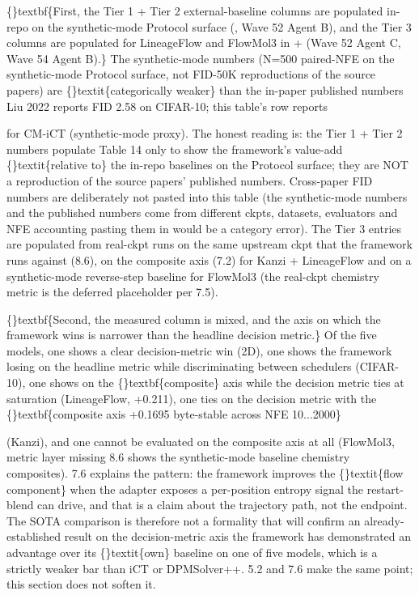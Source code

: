 \documentclass{article}
\begin{document}
\{\}textbf\{First, the Tier 1 + Tier 2 external-baseline columns are populated in-repo on the synthetic-mode Protocol surface (, Wave 52 Agent B), and the Tier 3 columns are populated for LineageFlow and FlowMol3 in  +  (Wave 52 Agent C, Wave 54 Agent B).\} The synthetic-mode numbers (N=500 paired-NFE on the synthetic-mode Protocol surface, not FID-50K reproductions of the source papers) are \{\}textit\{categorically weaker\} than the in-paper published numbers  Liu 2022 reports FID 2.58 on CIFAR-10; this table's  row reports

 for CM-iCT (synthetic-mode proxy). The honest reading is: the Tier 1 + Tier 2 numbers populate Table 14 only to show the framework's value-add \{\}textit\{relative to\} the in-repo baselines on the Protocol surface; they are NOT a reproduction of the source papers' published numbers. Cross-paper FID numbers are deliberately not pasted into this table (the synthetic-mode numbers and the published numbers come from different ckpts, datasets, evaluators and NFE accounting  pasting them in would be a category error). The Tier 3 entries are populated from real-ckpt runs on the same upstream ckpt that the framework runs against (8.6), on the composite axis (7.2) for Kanzi + LineageFlow and on a synthetic-mode reverse-step baseline for FlowMol3 (the real-ckpt chemistry metric is the deferred placeholder per 7.5).

\{\}textbf\{Second, the measured column is mixed, and the axis on which the framework wins is narrower than the headline decision metric.\} Of the five models, one shows a clear decision-metric win (2D), one shows the framework losing on the headline metric while discriminating between schedulers (CIFAR-10), one shows  on the \{\}textbf\{composite\} axis while the decision metric ties at saturation (LineageFlow, +0.211), one ties on the decision metric with the \{\}textbf\{composite axis +0.1695 byte-stable across NFE 10...2000\}

 (Kanzi), and one cannot be evaluated on the composite axis at all (FlowMol3, metric layer missing  8.6 shows the synthetic-mode baseline chemistry composites). 7.6 explains the pattern: the framework improves the \{\}textit\{flow component\} when the adapter exposes a per-position entropy signal the restart-blend can drive, and that is a claim about the trajectory path, not the endpoint. The SOTA comparison is therefore not a formality that will confirm an already-established result  on the decision-metric axis the framework has demonstrated an advantage over its \{\}textit\{own\} baseline on one of five models, which is a strictly weaker bar than iCT or DPMSolver++. 5.2 and 7.6 make the same point; this section does not soften it.
\end{document}
